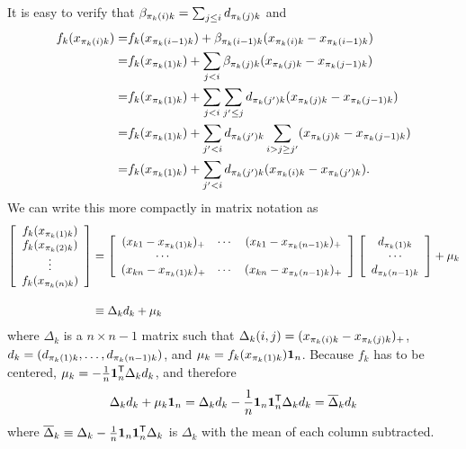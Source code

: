 It is easy to verify that $\beta_{\pi_k(i)k} = \sum_{j \leq i} d_{\pi_k(j)k}$ and 
\begin{align*}
f_k(x_{\pi_k(i)k}) = & f_k(x_{\pi_k(i-1)k}) + \beta_{\pi_k(i-1)k}(x_{\pi_k(i)k} - x_{\pi_k(i-1)k}) \\
 =& f_k(x_{\pi_k(1)k}) + \sum_{j < i} \beta_{\pi_k(j)k} (x_{\pi_k(j)k} - x_{\pi_k(j-1)k}) \\
 =& f_k(x_{\pi_k(1)k}) + \sum_{j < i} \sum_{j' \leq j} d_{\pi_k(j')k} (x_{\pi_k(j)k} - x_{\pi_k(j-1)k})\\
 =& f_k(x_{\pi_k(1)k}) + \sum_{j' < i} d_{\pi_k(j')k} \sum_{i > j \geq j'} (x_{\pi_k(j)k} - x_{\pi_k(j-1)k}) \\
 =& f_k(x_{\pi_k(1)k}) + \sum_{j' < i} d_{\pi_k(j')k} (x_{\pi_k(i)k} - x_{\pi_k(j')k}).
\end{align*}
We can write this more compactly in matrix notation as
\begin{align}
\nonumber
\left[ \begin{array}{c}
f_k(x_{\pi_k(1)k}) \\
f_k(x_{\pi_k(2)k}) \\
\vdots \\
f_k(x_{\pi_k(n)k})
\end{array} \right] &=
\left[ \begin{array}{ccc}
    (x_{k1} - x_{\pi_k(1)k})_+ & \cdots & (x_{k1} - x_{\pi_k(n-1)k})_+ \\
    \cdots & & \\
    (x_{kn} - x_{\pi_k(1)k})_+ & \cdots & (x_{kn} - x_{\pi_k(n-1)k})_+ 
\end{array} \right]
\left[ \begin{array}{c}
    d_{\pi_k(1)k} \\
    \cdots \\
    d_{\pi_k(n-1)k}
\end{array} \right] + \mu_k \\[10pt]
& \equiv \Delta_k d_k + \mu_k
\end{align}
where $\Delta_k$ is a $n\times n-1$ matrix such that $\Delta_k(i,j) =
(x_{\pi_k(i)k} - x_{\pi_k(j)k})_+$, $d_k = (d_{\pi_k(1)k} ,\ldots,
d_{\pi_k(n-1)k})$, and $\mu_k = f_k(x_{\pi_k(1)k}) \mbox{\boldmath $1$}_n$.
Because $f_k$ has to be centered, $\mu_k = - \frac{1}{n}
\mbox{\boldmath $1$}_n^{\mathsf{T}} \Delta_k d_k$, and therefore
\[
\Delta_k d_k + \mu_k \mbox{\boldmath $1$}_n = 
   \Delta_k d_k - \frac{1}{n} \mbox{\boldmath $1$}_n \mbox{\boldmath $1$}_n^{\mathsf{T}} \Delta_k d_k = 
   \overline{\Delta}_k d_k 
\]
where $\overline{\Delta}_k \equiv \Delta_k - \frac{1}{n} \mbox{\boldmath $1$}_n \mbox{\boldmath $1$}_n^{\mathsf{T}} \Delta_k$ is $\Delta_k$ with the mean of each column subtracted.

